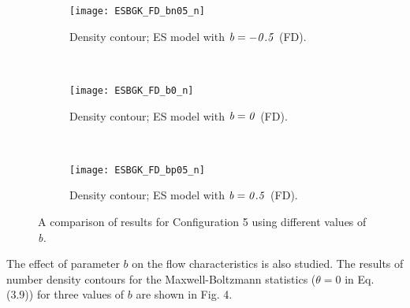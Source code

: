 \documentclass{rsproca}%
\begin{document}
\begin{figure}
				\begin{subfigure}[b]{0.32\textwidth}
                \centering
                \texttt{[image: ESBGK\_FD\_bn05\_n]}
                \caption{Density contour; ES model with $\it{b=-0.5}$ (FD).}
                \label{fig:ESBGK_FD_bn05_n}
        \end{subfigure}%
        ~ %
        \begin{subfigure}[b]{0.32\textwidth}
                \centering
                \texttt{[image: ESBGK\_FD\_b0\_n]}
                \caption{Density contour; ES model with $\it{b=0}$ (FD).}
                \label{fig:ESBGK_FD_b0_n}
        \end{subfigure}
        ~ %
        \begin{subfigure}[b]{0.32\textwidth}
                \centering
                \texttt{[image: ESBGK\_FD\_bp05\_n]}
                \caption{Density contour; ES model with $\it{b=0.5}$ (FD).}
                \label{fig:ESBGK_FD_bp05_n}
        \end{subfigure}	
        \caption{A comparison of results for Configuration 5 using different values of \it{b}.}\label{fig:test_b_parameter}
\end{figure}
The effect of parameter $b$ on the flow characteristics is also studied.  The results of number density contours for the Maxwell-Boltzmann statistics ($\theta=0$ in Eq. (3.9)) for three values of $b$ are shown in Fig. 4.
\end{document}
